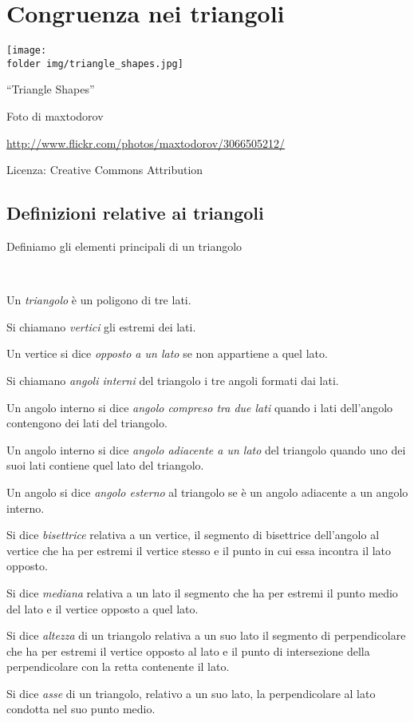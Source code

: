 
\chapter{Congruenza nei 
triangoli}\label{chap:congruenza_nei_triangoli}

\texttt{[image: \\folder img/triangle\_shapes.jpg]}
  \begin{center}
    {\large ``Triangle Shapes''}\par
    Foto di maxtodorov\par
    \url{http://www.flickr.com/photos/maxtodorov/3066505212/}\par
    Licenza: Creative Commons Attribution\par
  \end{center}
\newpage

\section{Definizioni relative ai 
triangoli}\label{sect:definizioni_triangoli}

Definiamo gli elementi principali di un triangolo
\begin{definizione}~
\begin{itemize*}
\item Un \emph{triangolo} è un poligono di tre lati.
\item Si chiamano \emph{vertici} gli estremi dei lati.
\item Un vertice si dice \emph{opposto a un lato} se non appartiene a 
quel lato.
\item Si chiamano \emph{angoli interni} del triangolo i tre angoli 
formati dai lati.
\item Un angolo interno si dice \emph{angolo compreso tra due lati} 
quando i lati dell'angolo contengono dei lati del triangolo.
\item Un angolo interno si dice \emph{angolo adiacente a un lato} del 
triangolo quando uno dei suoi lati contiene quel lato del triangolo.
\item Un angolo si dice \emph{angolo esterno} al triangolo se è un 
angolo adiacente a un angolo interno.
\item Si dice \emph{bisettrice} relativa a un vertice, il segmento di 
bisettrice dell'angolo al vertice che ha per estremi il vertice 
stesso e il punto in cui essa incontra il lato opposto.
\item Si dice \emph{mediana} relativa a un lato il segmento che ha 
per estremi il punto medio del lato e il vertice opposto a quel lato.
\item Si dice \emph{altezza} di un triangolo relativa a un suo lato 
il segmento di perpendicolare che ha per estremi il vertice opposto 
al lato e il punto di intersezione della perpendicolare con la retta 
contenente il lato. 
\item Si dice \emph{asse} di un triangolo, relativo a un suo lato, la 
perpendicolare al lato condotta nel suo punto medio.
\end{itemize*}
\end{definizione}

